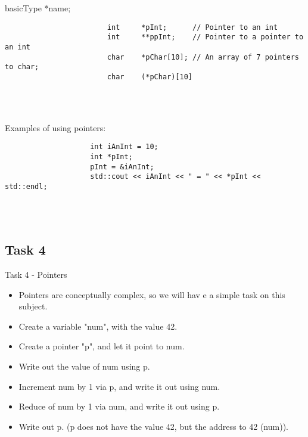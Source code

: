 \documentclass{report}
\begin{document}
				\begin{minipage}{\linewidth}
					basicType *name;
					\begin{lstlisting}
						int		*pInt;		// Pointer to an int
						int		**ppInt;	// Pointer to a pointer to an int
						char	*pChar[10];	// An array of 7 pointers to char;
						char	(*pChar)[10]
					\end{lstlisting}
				\end{minipage}
				\\ \\
				
				\begin{minipage}{\linewidth}
					Examples of using pointers:
					\begin{lstlisting}
					int	iAnInt = 10;
					int	*pInt;
					pInt = &iAnInt;
					std::cout << iAnInt << " = " << *pInt << std::endl;
					\end{lstlisting}
				\end{minipage}
				\\ \\
			
			
			\subsection{Task 4}
				Task 4 - Pointers \\
				
				\begin{itemize}
					\item Pointers are conceptually complex, so we will hav e a simple task on this subject.
					\item Create a variable "num", with the value 42.
					\item Create a pointer "p", and let it point to num.
					\item Write out the value of num using p.
					\item Increment num by 1 via p, and write it out using num.
					\item Reduce of num by 1 via num, and write it out using p.
					\item Write out p. (p does not have the value 42, but the address to 42 (num)).
				\end{itemize}
				
\end{document}
